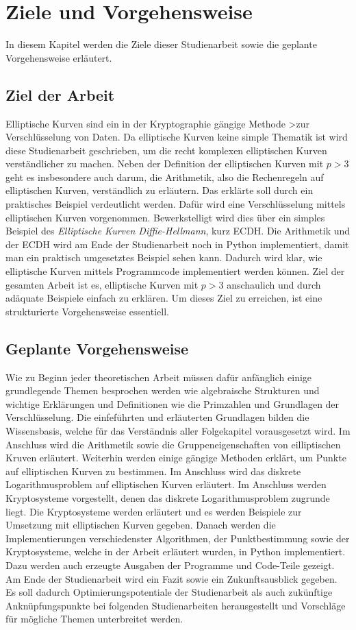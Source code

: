\chapter{Ziele und Vorgehensweise}
In diesem Kapitel werden die Ziele dieser Studienarbeit sowie die geplante Vorgehensweise erläutert.

\section{Ziel der Arbeit}
Elliptische Kurven sind ein in der Kryptographie gängige Methode >zur Verschlüsselung von Daten. Da elliptische Kurven keine simple Thematik ist wird diese Studienarbeit geschrieben, um die recht komplexen elliptischen Kurven verständlicher zu machen. Neben der Definition der elliptischen Kurven mit $p > 3$ geht es insbesondere auch darum, die Arithmetik, also die Rechenregeln auf elliptischen Kurven, verständlich zu erläutern. Das erklärte soll durch ein praktisches Beispiel verdeutlicht werden. Dafür wird eine Verschlüsselung mittels elliptischen Kurven vorgenommen. Bewerkstelligt wird dies über ein simples Beispiel des \textit{Elliptische Kurven Diffie-Hellmann}, kurz ECDH. Die Arithmetik und der ECDH wird am Ende der Studienarbeit noch in Python implementiert, damit man ein praktisch umgesetztes Beispiel sehen kann. Dadurch wird klar, wie elliptische Kurven mittels Programmcode implementiert werden können. Ziel der gesamten Arbeit ist es, elliptische Kurven mit $p > 3$ anschaulich und durch adäquate Beispiele einfach zu erklären. Um dieses Ziel zu erreichen, ist eine strukturierte Vorgehensweise essentiell.

\section{Geplante Vorgehensweise}
Wie zu Beginn jeder theoretischen Arbeit müssen dafür anfänglich einige grundlegende Themen besprochen werden wie algebraische Strukturen und wichtige Erklärungen und Definitionen wie die Primzahlen und Grundlagen der Verschlüsselung. Die einfeführten und erläuterten Grundlagen bilden die Wissensbasis, welche für das Verständnis aller Folgekapitel vorausgesetzt wird. Im Anschluss wird die Arithmetik sowie die Gruppeneigenschaften von eilliptischen Kruven erläutert. Weiterhin werden einige gängige Methoden erklärt, um Punkte auf elliptischen Kurven zu bestimmen. Im Anschluss wird das diskrete Logarithmusproblem auf elliptischen Kurven erläutert. Im Anschluss werden Kryptosysteme vorgestellt, denen das diskrete Logarithmusproblem zugrunde liegt. Die Kryptosysteme werden erläutert und es werden Beispiele zur Umsetzung mit elliptischen Kurven gegeben. Danach werden die Implementierungen verschiedenster Algorithmen, der Punktbestimmung sowie der Kryptosysteme, welche in der Arbeit erläutert wurden, in Python implementiert. Dazu werden auch erzeugte Ausgaben der Programme und Code-Teile gezeigt. Am Ende der Studienarbeit wird ein Fazit sowie ein Zukunftsausblick gegeben. Es soll dadurch Optimierungspotentiale der Studienarbeit als auch zukünftige Anknüpfungspunkte bei folgenden Studienarbeiten herausgestellt und Vorschläge für mögliche Themen unterbreitet werden.

